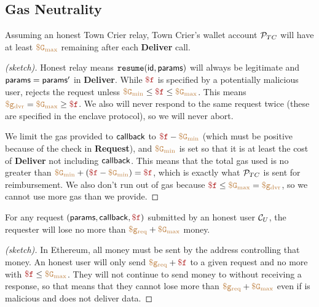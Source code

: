 \subsection{Gas Neutrality}


\begin{theorem}
Assuming an honest Town Crier relay,
Town Crier's wallet account ${\cal P}_{TC}$ will have at least $\tt {\color{brown} \$G_\text{max} }$ remaining after each {\bf Deliver} call.
\end{theorem}

\begin{proof}[(sketch)]
Honest relay means $\texttt{resume}({\sf id}, {\sf params})$ will always be legitimate and ${\sf params} = {\sf params}'$ in {\bf Deliver}.
While $\fee$ is specified by a potentially malicious user, \tcont rejects the request unless $\constgasmin \leq \fee \leq \constgasmax$.
This means $\gasdeliver = \constgasmax \geq \fee$.
We also will never respond to the same request twice (these are specified in the enclave protocol), so we will never abort.

We limit the gas provided to ${\sf callback}$ to $\fee - \constgasmin$ (which must be positive because of the check in {\bf Request}),
and $\tt {\color{brown} \$G_\text{min} }$ is set so that it is at least the cost of {\bf Deliver} not including ${\sf callback}$.
This means that the total gas used is no greater than $\constgasmin + (\fee - \constgasmin) = \fee$, which is exactly what ${\cal P}_{TC}$ is sent for reimbursement.
We also don't run out of gas because $\fee \leq \constgasmax = \gasdeliver$, so we cannot use more gas than we provide.
\end{proof}


\begin{theorem}
For any request $(\dgform, \dgcallback, \fee)$ submitted by an honest user ${\cal C}_U$,
the requester will lose no more than $\tt {\color{brown} \$g_\text{req} } + \tt {\color{brown} \$G_\text{max} }$ money.
\end{theorem}

\begin{proof}[(sketch)]
In Ethereum, all money must be sent by the address controlling that money.
An honest user will only send $\gasrequest + \fee$ to a given request and no more with $\fee \leq \constgasmax$.
They will not continue to send money to \tcont without receiving a response, so that means that they cannot lose more than $\tt {\color{brown} \$g_\text{req} } + \tt {\color{brown} \$G_\text{max} }$
even if \tc is malicious and does not deliver data.
\end{proof}



